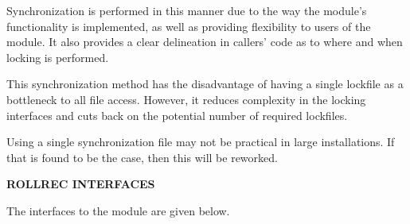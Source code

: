 Synchronization is performed in this manner due to the way the module's
functionality is implemented, as well as providing flexibility to users of the
module.  It also provides a clear delineation in callers' code as to where and
when  locking is performed.

This synchronization method has the disadvantage of having a single lockfile
as a bottleneck to all  file access.  However, it reduces
complexity in the locking interfaces and cuts back on the potential number of
required lockfiles.

Using a single synchronization file may not be practical in large
installations.  If that is found to be the case, then this will be reworked.

{\bf ROLLREC INTERFACES}

The interfaces to the  module are given below.

